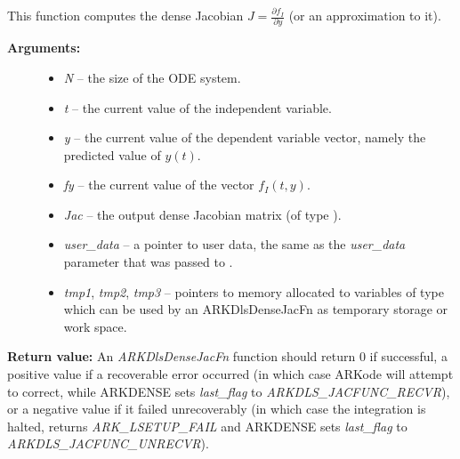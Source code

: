 \documentclass[letterpaper,10pt,english]{sphinxmanual}
\begin{document}
\begin{fulllineitems}
\label{c_interface/User_supplied:ARKDlsDenseJacFn}
This function computes the dense Jacobian $J =
\frac{\partial f_I}{\partial y}$ (or an approximation to it).
\begin{description}
\item[{\textbf{Arguments:}}] \leavevmode\begin{itemize}
\item {} 
\emph{N} -- the size of the ODE system.

\item {} 
\emph{t} -- the current value of the independent variable.

\item {} 
\emph{y} -- the current value of the dependent variable vector, namely
the predicted value of $y(t)$.

\item {} 
\emph{fy} -- the current value of the vector $f_I(t,y)$.

\item {} 
\emph{Jac} -- the output dense Jacobian matrix (of type ).

\item {} 
\emph{user\_data} -- a pointer to user data, the same as the
\emph{user\_data} parameter that was passed to {\hyperref[c_interface/User_callable:ARKodeSetUserData]{}}.

\item {} 
\emph{tmp1}, \emph{tmp2}, \emph{tmp3} -- pointers to memory allocated to
variables of type  which can be used by an
ARKDlsDenseJacFn as temporary storage or work space.

\end{itemize}

\end{description}

\textbf{Return value:}
An \emph{ARKDlsDenseJacFn} function should return 0 if
successful, a positive value if a recoverable error occurred (in
which case ARKode will attempt to correct, while ARKDENSE
sets \emph{last\_flag} to \emph{ARKDLS\_JACFUNC\_RECVR}), or a negative
value if it failed unrecoverably (in which case the integration is
halted, {\hyperref[c_interface/User_callable:ARKode]{}} returns \emph{ARK\_LSETUP\_FAIL} and
ARKDENSE sets \emph{last\_flag} to \emph{ARKDLS\_JACFUNC\_UNRECVR}).


\end{fulllineitems}
\end{document}

